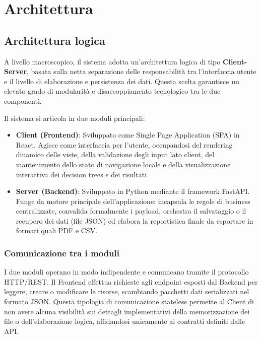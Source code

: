 \documentclass[a4paper,12pt]{article}
\begin{document}
    \newpage

    \section{Architettura}
        \subsection{Architettura logica}
            A livello macroscopico, il sistema adotta un'architettura logica di tipo \textbf{Client-Server}, basata sulla netta separazione delle responsabilità tra l'interfaccia utente e il livello di elaborazione e persistenza dei dati. Questa scelta garantisce un elevato grado di modularità e disaccoppiamento tecnologico tra le due componenti.

            Il sistema si articola in due moduli principali:

            \begin{itemize}
                \item \textbf{Client (Frontend)}: Sviluppato come Single Page Application (SPA) in React. Agisce come interfaccia per l'utente, occupandosi del rendering dinamico delle viste, della validazione degli input lato client, del mantenimento dello stato di navigazione locale e della visualizzazione interattiva dei decision trees e dei risultati.
                \item \textbf{Server (Backend)}: Sviluppato in Python mediante il framework FastAPI. Funge da motore principale dell'applicazione: incapsula le regole di business centralizzate, convalida formalmente i payload, orchestra il salvataggio o il recupero dei dati (file JSON) ed elabora la reportistica finale da esportare in formati quali PDF e CSV.
            \end{itemize}
        \subsubsection{Comunicazione tra i moduli}
            I due moduli operano in modo indipendente e comunicano tramite il protocollo HTTP/REST. Il Frontend effettua richieste agli endpoint esposti dal Backend per leggere, creare o modificare le risorse, scambiando pacchetti dati serializzati nel formato JSON. Questa tipologia di comunicazione stateless permette al Client di non avere alcuna visibilità sui dettagli implementativi della memorizzazione dei file o dell'elaborazione logica, affidandosi unicamente ai contratti definiti dalle API.
\end{document}
